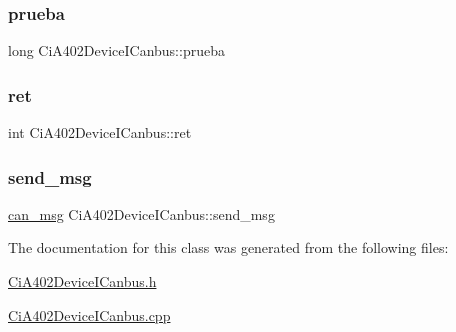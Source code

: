 \subsubsection{\texorpdfstring{prueba}{prueba}}
{\footnotesize\ttfamily long Ci\+A402\+Device\+I\+Canbus\+::prueba\hspace{0.3cm}{\ttfamily [private]}}

\mbox{\label{classCiA402DeviceICanbus_af6cf1493b669ce0415cefed7d84e5710}} 
\subsubsection{\texorpdfstring{ret}{ret}}
{\footnotesize\ttfamily int Ci\+A402\+Device\+I\+Canbus\+::ret}

\mbox{\label{classCiA402DeviceICanbus_a47d8ee98f0f3569874a4018268ab1fb5}} 
\subsubsection{\texorpdfstring{send\+\_\+msg}{send\_msg}}
{\footnotesize\ttfamily \hyperlink{structcan__msg}{can\+\_\+msg} Ci\+A402\+Device\+I\+Canbus\+::send\+\_\+msg\hspace{0.3cm}{\ttfamily [private]}}



The documentation for this class was generated from the following files\+:\begin{DoxyCompactItemize}
\item 
\hyperlink{CiA402DeviceICanbus_8h}{Ci\+A402\+Device\+I\+Canbus.\+h}\item 
\hyperlink{CiA402DeviceICanbus_8cpp}{Ci\+A402\+Device\+I\+Canbus.\+cpp}\end{DoxyCompactItemize}
